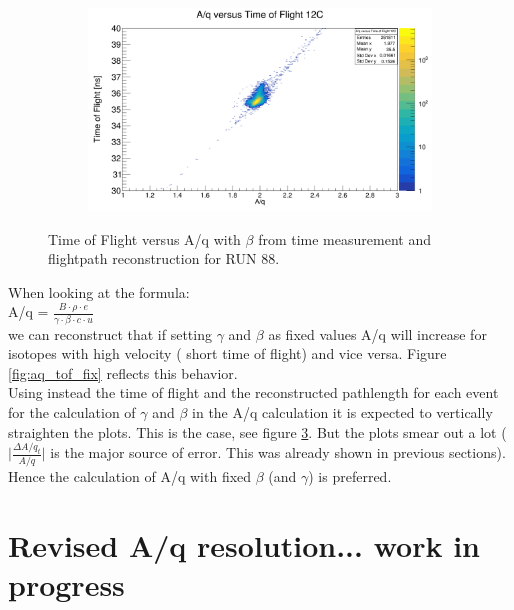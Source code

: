 \documentclass[12pt, letterpaper]{article}
\begin{document}
\begin{figure}[!htbp]
\begin{subfigure}{.5\textwidth}
  \caption{}
  \label{fig:sub-second}
\end{subfigure}
\begin{subfigure}{.5\textwidth}
  \centering
  \includegraphics[width=.9\linewidth]{aq_tof12c.png} 
  \caption{}
  \label{fig:sub-second}
\end{subfigure}
\caption{Time of Flight versus A/q with  $\beta$ from time measurement and flightpath reconstruction for RUN 88.}
\label{fig:aq_tof}
\end{figure}

When looking at the formula:\\
A/q = $\frac{B \cdot \rho \cdot e}{\gamma\cdot\beta \cdot c \cdot u}$ \\
we can reconstruct that if setting $\gamma$ and $\beta$ as fixed values A/q will increase for isotopes with high velocity ( short time of flight) and vice versa. Figure \ref{fig:aq_tof_fix} reflects this behavior.\\
Using instead the time of flight and the reconstructed pathlength for each event for the calculation of $\gamma$ and $\beta$ in the A/q calculation it is expected to vertically straighten the plots. This is the case, see figure \ref{fig:aq_tof}. But the plots smear out a lot ($\big|\frac{\Delta A/q_{t}}{A/q}\big|$ is the major source of error. This was already shown in previous sections). Hence the calculation of A/q with fixed $\beta$ (and $\gamma$) is preferred. 
\newpage

\section{Revised A/q resolution... work in progress}
\end{document}
